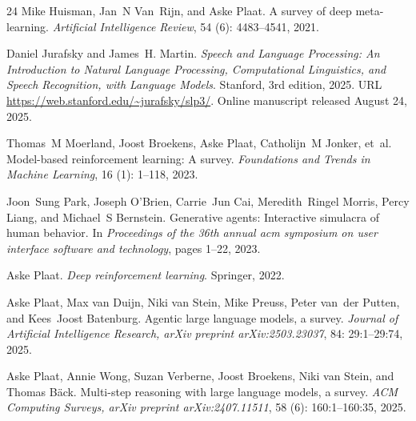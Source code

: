 \begin{thebibliography}{24}
Mike Huisman, Jan~N Van~Rijn, and Aske Plaat.
\newblock A survey of deep meta-learning.
\newblock \emph{Artificial Intelligence Review}, 54 (6): 4483--4541, 2021.

Daniel Jurafsky and James~H. Martin.
\newblock \emph{Speech and Language Processing: An Introduction to Natural Language Processing, Computational Linguistics, and Speech Recognition, with Language Models}.
\newblock Stanford, 3rd edition, 2025.
\newblock URL \url{https://web.stanford.edu/~jurafsky/slp3/}.
\newblock Online manuscript released August 24, 2025.

Thomas~M Moerland, Joost Broekens, Aske Plaat, Catholijn~M Jonker, et~al.
\newblock Model-based reinforcement learning: A survey.
\newblock \emph{Foundations and Trends{\textregistered} in Machine Learning}, 16 (1): 1--118, 2023.

Joon~Sung Park, Joseph O'Brien, Carrie~Jun Cai, Meredith~Ringel Morris, Percy Liang, and Michael~S Bernstein.
\newblock Generative agents: Interactive simulacra of human behavior.
\newblock In \emph{Proceedings of the 36th annual acm symposium on user interface software and technology}, pages 1--22, 2023.

Aske Plaat.
\newblock \emph{Deep reinforcement learning}.
\newblock Springer, 2022.

Aske Plaat, Max van Duijn, Niki van Stein, Mike Preuss, Peter van~der Putten, and Kees~Joost Batenburg.
\newblock Agentic large language models, a survey.
\newblock \emph{Journal of Artificial Intelligence Research, arXiv preprint arXiv:2503.23037}, 84: 29:1--29:74, 2025{}.

Aske Plaat, Annie Wong, Suzan Verberne, Joost Broekens, Niki van Stein, and Thomas B\"ack.
\newblock Multi-step reasoning with large language models, a survey.
\newblock \emph{ACM Computing Surveys, arXiv preprint arXiv:2407.11511}, 58 (6): 160:1--160:35, 2025{}.


\end{thebibliography}

